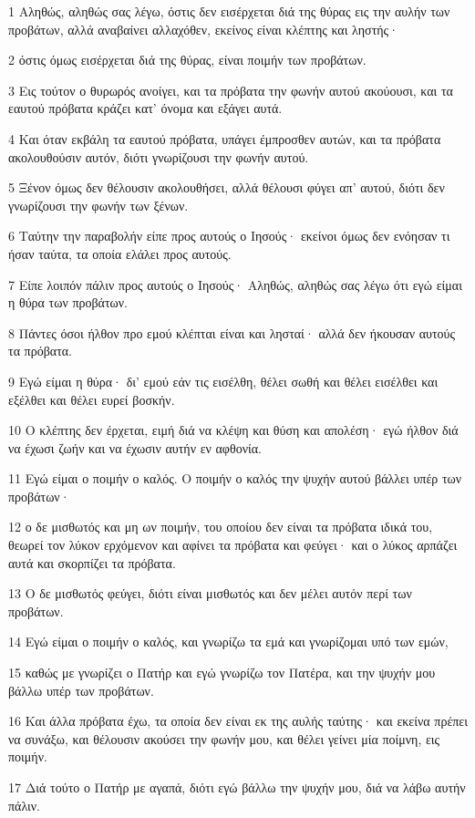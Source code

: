 \par 1 Αληθώς, αληθώς σας λέγω, όστις δεν εισέρχεται διά της θύρας εις την αυλήν των προβάτων, αλλά αναβαίνει αλλαχόθεν, εκείνος είναι κλέπτης και ληστής·
\par 2 όστις όμως εισέρχεται διά της θύρας, είναι ποιμήν των προβάτων.
\par 3 Εις τούτον ο θυρωρός ανοίγει, και τα πρόβατα την φωνήν αυτού ακούουσι, και τα εαυτού πρόβατα κράζει κατ' όνομα και εξάγει αυτά.
\par 4 Και όταν εκβάλη τα εαυτού πρόβατα, υπάγει έμπροσθεν αυτών, και τα πρόβατα ακολουθούσιν αυτόν, διότι γνωρίζουσι την φωνήν αυτού.
\par 5 Ξένον όμως δεν θέλουσιν ακολουθήσει, αλλά θέλουσι φύγει απ' αυτού, διότι δεν γνωρίζουσι την φωνήν των ξένων.
\par 6 Ταύτην την παραβολήν είπε προς αυτούς ο Ιησούς· εκείνοι όμως δεν ενόησαν τι ήσαν ταύτα, τα οποία ελάλει προς αυτούς.
\par 7 Είπε λοιπόν πάλιν προς αυτούς ο Ιησούς· Αληθώς, αληθώς σας λέγω ότι εγώ είμαι η θύρα των προβάτων.
\par 8 Πάντες όσοι ήλθον προ εμού κλέπται είναι και λησταί· αλλά δεν ήκουσαν αυτούς τα πρόβατα.
\par 9 Εγώ είμαι η θύρα· δι' εμού εάν τις εισέλθη, θέλει σωθή και θέλει εισέλθει και εξέλθει και θέλει ευρεί βοσκήν.
\par 10 Ο κλέπτης δεν έρχεται, ειμή διά να κλέψη και θύση και απολέση· εγώ ήλθον διά να έχωσι ζωήν και να έχωσιν αυτήν εν αφθονία.
\par 11 Εγώ είμαι ο ποιμήν ο καλός. Ο ποιμήν ο καλός την ψυχήν αυτού βάλλει υπέρ των προβάτων·
\par 12 ο δε μισθωτός και μη ων ποιμήν, του οποίου δεν είναι τα πρόβατα ιδικά του, θεωρεί τον λύκον ερχόμενον και αφίνει τα πρόβατα και φεύγει· και ο λύκος αρπάζει αυτά και σκορπίζει τα πρόβατα.
\par 13 Ο δε μισθωτός φεύγει, διότι είναι μισθωτός και δεν μέλει αυτόν περί των προβάτων.
\par 14 Εγώ είμαι ο ποιμήν ο καλός, και γνωρίζω τα εμά και γνωρίζομαι υπό των εμών,
\par 15 καθώς με γνωρίζει ο Πατήρ και εγώ γνωρίζω τον Πατέρα, και την ψυχήν μου βάλλω υπέρ των προβάτων.
\par 16 Και άλλα πρόβατα έχω, τα οποία δεν είναι εκ της αυλής ταύτης· και εκείνα πρέπει να συνάξω, και θέλουσιν ακούσει την φωνήν μου, και θέλει γείνει μία ποίμνη, εις ποιμήν.
\par 17 Διά τούτο ο Πατήρ με αγαπά, διότι εγώ βάλλω την ψυχήν μου, διά να λάβω αυτήν πάλιν.

